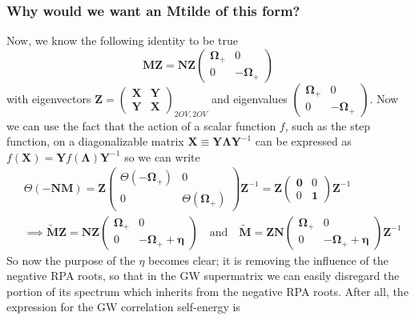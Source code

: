 \subsubsection{Why would we want an Mtilde of this form?}
Now, we know the following identity to be true
\begin{equation}
\bm{M} \bm{Z} = \bm{N} \bm{Z} \begin{pmatrix}
\boldsymbol{\Omega}_{+} & 0 \\
0 & -\boldsymbol{\Omega}_{+}
\end{pmatrix}
\end{equation}
with eigenvectors $\bm{Z}=\begin{pmatrix}
\bm{X} & \bm{Y} \\
\bm{Y} & \bm{X}
\end{pmatrix}_{2OV,2OV}$ and eigenvalues $\begin{pmatrix}
\bm{\Omega}_{+} & 0 \\
0 & -\bm{\Omega}_{+}
\end{pmatrix}$.
Now we can use the fact that the action of a scalar function $f$, such as the step function, on a diagonalizable matrix $\bm{X} \equiv \bm{Y} \bm{\Lambda} \bm{Y}^{-1}$ can be expressed as $f(\bm{X}) = \bm{Y} f(\bm{\Lambda}) \bm{Y}^{-1}$
so we can write
\begin{align}
    &\Theta(-\bm{N}\bm{M}) = \bm{Z} \left(\begin{array}{cc}\Theta(-\boldsymbol{\Omega}_{+}) & 0 \\ 0 & \Theta(\boldsymbol{\Omega}_{+})\end{array}\right)\bm{Z}^{-1} = \bm{Z} \left(\begin{array}{cc}\bm{0} & 0 \\ 0 & \bm{1}\end{array}\right)\bm{Z}^{-1} \\
& \implies \tilde{\bm{M}} \bm{Z} = \bm{N}\bm{Z}\left(\begin{array}{cc}\boldsymbol{\Omega}_{+} & 0 \\ 0 & -\boldsymbol{\Omega}_{+} + \bm{\eta}\end{array}\right) \quad \text{and} \quad \tilde{\bm{M}} = \bm{Z}\bm{N}\left(\begin{array}{cc}\boldsymbol{\Omega}_{+} & 0 \\ 0 & -\boldsymbol{\Omega}_{+} + \bm{\eta}\end{array}\right)\bm{Z}^{-1}
\end{align}
So now the purpose of the $\eta$ becomes clear; it is removing the influence of the negative RPA roots, so that in the GW supermatrix we can easily disregard the portion of its spectrum which inherits from the negative RPA roots. After all, the expression for the GW correlation self-energy is
